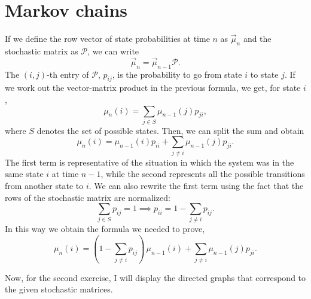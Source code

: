 \section{Markov chains}
If we define the row vector of state probabilities at time $n$ as
$\vec{\mu}_{n}$ and the stochastic matrix as $\mathcal{P}$, we can write
\begin{equation}
    \vec{\mu}_{n} = \vec{\mu}_{n-1} \mathcal{P}.
\end{equation}
The $(i, j)$-th entry of $\mathcal{P}$, $p_{ij}$, is the probability to go from
state $i$ to state $j$. If we work out the vector-matrix product in the previous
formula, we get, for state $i$,
\begin{equation}
    \mu_{n}(i) = \sum_{j \in S} \mu_{n-1}(j) p_{ji},
\end{equation}
where $S$ denotes the set of possible states. Then, we can split the sum and
obtain
\begin{equation}
    \mu_{n}(i) = \mu_{n-1}(i) p_{ii} + \sum_{j \neq i} \mu_{n-1}(j) p_{ji}.
\end{equation}
The first term is representative of the situation in which the system was in the
same state $i$ at time $n-1$, while the second represents all the possible
transitions from another state to $i$. We can also rewrite the first term using
the fact that the rows of the stochastic matrix are normalized:
\begin{equation}
    \sum_{j \in S} p_{ij} = 1 \implies p_{ii} = 1 - \sum_{j \neq i} p_{ij}.
\end{equation}
In this way we obtain the formula we needed to prove,
\begin{equation}
    \mu_{n}(i) = \left(1 - \sum_{j \neq i} p_{ij}\right)
    \, \mu_{n-1}(i) + \sum_{j \neq i} \mu_{n-1}(j) p_{ji}.
\end{equation}

Now, for the second exercise, I will display the directed graphs that correspond
to the given stochastic matrices.

